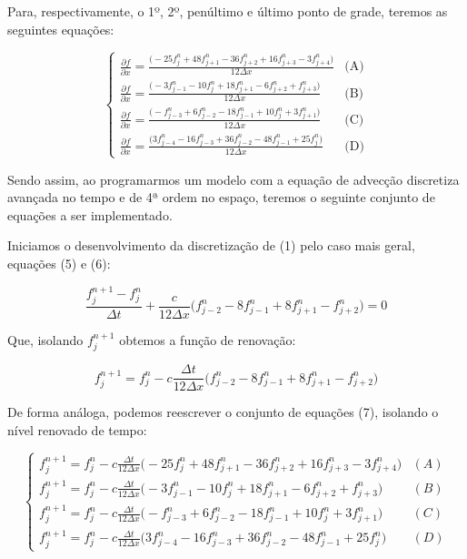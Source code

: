 \documentclass[11pt]{article}
\begin{document}
Para, respectivamente, o 1º, 2º, penúltimo e último ponto de grade,
teremos as seguintes equações:

\begin{equation}
\begin{cases}
    \frac{\partial{f}}{\partial{x}} = \frac{\biggl( - 25f^{n}_{j} + 48f^{n}_{j+1} - 36f^{n}_{j+2} + 16f^{n}_{j+3} - 3f^{n}_{j+4} \bigg)}{12\Delta{x}} & \text{(A)}\\
    \frac{\partial{f}}{\partial{x}} = \frac{\biggl( - 3f^{n}_{j-1} - 10f^{n}_{j} + 18f^{n}_{j+1} - 6f^{n}_{j+2} + f^{n}_{j+3} \bigg)}{12\Delta{x}} & \text{(B)}\\
    \frac{\partial{f}}{\partial{x}} = \frac{\biggl( - f^{n}_{j-3} + 6f^{n}_{j-2} - 18f^{n}_{j-1} + 10f^{n}_{j} + 3f^{n}_{j+1} \bigg)}{12\Delta{x}} & \text{(C)}\\
    \frac{\partial{f}}{\partial{x}} = \frac{\biggl( 3f^{n}_{j-4} - 16f^{n}_{j-3} + 36f^{n}_{j-2} - 48f^{n}_{j-1} + 25f^{n}_{j} \bigg)}{12\Delta{x}} & \text{(D)}
\end{cases}
\end{equation}

Sendo assim, ao programarmos um modelo com a equação de advecção
discretiza avançada no tempo e de 4ª ordem no espaço, teremos o seguinte
conjunto de equações a ser implementado.

Iniciamos o desenvolvimento da discretização de (1) pelo caso mais
geral, equações (5) e (6):

\begin{equation}
    \frac{f^{n+1}_{j} - f^{n}_{j}}{\Delta{t}} + \frac{c}{12\Delta{x}}\biggl( f^{n}_{j-2} - 8f^{n}_{j-1} + 8f^{n}_{j+1} - f^{n}_{j+2} \bigg) = 0
\end{equation}

Que, isolando \(f^{n+1}_{j}\) obtemos a função de renovação:

\begin{equation}
    f^{n+1}_{j} = f^{n}_{j}-c\frac{\Delta{t}}{12\Delta{x}}\biggl( f^{n}_{j-2} - 8f^{n}_{j-1} + 8f^{n}_{j+1} - f^{n}_{j+2} \bigg)    
\end{equation}

De forma análoga, podemos reescrever o conjunto de equações (7),
isolando o nível renovado de tempo:

\begin{equation}
    \begin{cases}
            f^{n+1}_{j} = f^{n}_{j}-c\frac{\Delta{t}}{12\Delta{x}}\biggl( - 25f^{n}_{j} + 48f^{n}_{j+1} - 36f^{n}_{j+2} + 16f^{n}_{j+3} - 3f^{n}_{j+4} \bigg) & (A) \\
            f^{n+1}_{j} = f^{n}_{j}-c\frac{\Delta{t}}{12\Delta{x}}\biggl( - 3f^{n}_{j-1} - 10f^{n}_{j} + 18f^{n}_{j+1} - 6f^{n}_{j+2} + f^{n}_{j+3}  \bigg) & (B) \\
            f^{n+1}_{j} = f^{n}_{j}-c\frac{\Delta{t}}{12\Delta{x}}\biggl( - f^{n}_{j-3} + 6f^{n}_{j-2} - 18f^{n}_{j-1} + 10f^{n}_{j} + 3f^{n}_{j+1} \bigg) & (C) \\
            f^{n+1}_{j} = f^{n}_{j}-c\frac{\Delta{t}}{12\Delta{x}}\biggl( 3f^{n}_{j-4} - 16f^{n}_{j-3} + 36f^{n}_{j-2} - 48f^{n}_{j-1} + 25f^{n}_{j} \bigg) & (D)
    \end{cases}
\end{equation}
\end{document}
